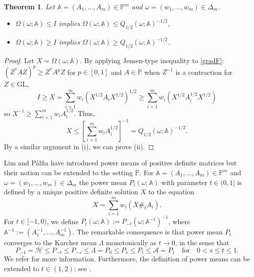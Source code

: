 \documentclass[12pt,reqno]{amsart}
\newtheorem{theorem}{Theorem}[section]
\begin{document}
\begin{theorem}
Let $\mathbb{A} = (A_1, \ldots, A_m) \in \mathbb{P}^m$ and $\omega = (w_{1}, \dots, w_{m}) \in \Delta_{m}$.
\begin{itemize}
  \item[(i)] $\Omega(\omega; \mathbb{A}) \leq I$ implies $\Omega(\omega; \mathbb{A}) \leq Q_{1/2}(\omega; \mathbb{A})^{-1/2}$,
  \item[(ii)] $\Omega(\omega; \mathbb{A}) \geq I$ implies $\Omega(\omega; \mathbb{A}) \geq Q_{1/2}(\omega; \mathbb{A})^{-1/2}$.
\end{itemize}
\end{theorem}

\begin{proof}
Let $X = \Omega(\omega; \mathbb{A})$. By applying Jensen-type inequality to \eqref{gradF}: $(Z^{*} A Z)^{p} \geq Z^{*} A^{p} Z$ for $p \in [0,1]$ and $A \in \mathbb{P}$ when $Z^{-1}$ is a contraction for $Z \in \mathrm{GL}$,
\begin{displaymath}
I \geq X = \sum_{i=1}^{m} w_{i} (X^{1/2} A_{i} X^{1/2})^{1/2} \geq \sum_{i=1}^{m} w_{i} (X^{1/2} A_{i}^{1/2} X^{1/2})
\end{displaymath}
so $\displaystyle X^{-1} \geq \sum_{i=1}^{m} w_{i} A_{i}^{1/2}$. Thus,
\begin{displaymath}
X \leq \left[ \sum_{i=1}^{m} w_{i} A_{i}^{1/2} \right]^{-1} = Q_{1/2}(\omega; \mathbb{A})^{-1/2}.
\end{displaymath}
By a similar argument in (i), we can prove (ii).
\end{proof}


Lim and P\'{a}lfia \cite{LP12} have introduced power means of positive definite matrices but their notion can be extended to the setting $\mathbb{P}$.
For $\mathbb{A} = (A_1, \ldots, A_m) \in \mathbb{P}^m$ and $\omega = (w_{1}, \dots, w_{m}) \in \Delta_{m}$ the power mean $P_{t}(\omega; \mathbb{A})$ with parameter $t \in (0,1]$ is defined by a unique positive definite solution $X$ to the equation
\begin{displaymath}
X = \sum_{i=1}^{m} w_{i} (X \#_{t} A_{i}).
\end{displaymath}
For $t \in [-1,0)$, we define $P_{t}(\omega; \mathbb{A}) := P_{-t}(\omega; \mathbb{A}^{-1})^{-1}$, where $\mathbb{A}^{-1} := (A_1^{-1}, \ldots, A_m^{-1})$.
The remarkable consequence is that power mean $P_{t}$ converges to the Karcher mean $\Lambda$ monotonically as $t \to 0$, in the sense that
\begin{equation*} \label{E:power-means}
P_{-1} = \mathcal{H} \leq P_{-t} \leq P_{-s} \leq \Lambda = P_{0} \leq P_{s} \leq P_{t} \leq \mathcal{A} = P_{1} \quad \textrm{for} \quad 0 < s \leq t \leq 1.
\end{equation*}
We refer \cite{LL14} for more information. Furthermore, the definition of power means can be extended to $t \in (1,2)$: see \cite{Seo}.
\end{document}

